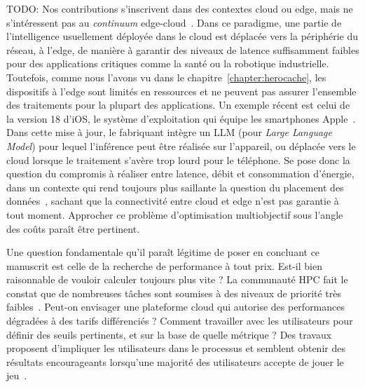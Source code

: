 TODO: Nos contributions s'inscrivent dans des contextes cloud ou edge, mais ne s'intéressent pas au \textit{continuum} edge-cloud~\cite{jansenSPECRGReferenceArchitecture2023}. Dans ce paradigme, une partie de l'intelligence usuellement déployée dans le cloud est déplacée vers la périphérie du réseau, à l'edge, de manière à garantir des niveaux de latence suffisamment faibles pour des applications critiques comme la santé ou la robotique industrielle. Toutefois, comme nous l'avons vu dans le chapitre~\ref{chapter:herocache}, les dispositifs à l'edge sont limités en ressources et ne peuvent pas assurer l'ensemble des traitements pour la plupart des applications. Un exemple récent est celui de la version 18 d'iOS, le système d'exploitation qui équipe les smartphones Apple~\cite{WhatAppleIntelligence}. Dans cette mise à jour, le fabriquant intègre un \gls{LLM} (pour \textit{Large Language Model}) pour lequel l'inférence peut être réalisée sur l'appareil, ou déplacée vers le cloud lorsque le traitement s'avère trop lourd pour le téléphone. Se pose donc la question du compromis à réaliser entre latence, débit et consommation d'énergie, dans un contexte qui rend toujours plus saillante la question du placement des données~\cite{chikhaouiMultiobjectiveOptimizationData2021a}, sachant que la connectivité entre cloud et edge n'est pas garantie à tout moment. Approcher ce problème d'optimisation multiobjectif sous l'angle des coûts paraît être pertinent.

Une question fondamentale qu'il paraît légitime de poser en concluant ce manuscrit est celle de la recherche de performance à tout prix. Est-il bien raisonnable de vouloir calculer toujours plus vite ? La communauté \gls{HPC} fait le constat que de nombreuses tâches sont soumises à des niveaux de priorité très faibles~\cite{tirmaziBorgNextGeneration2020}. Peut-on envisager une plateforme cloud qui autorise des performances dégradées à des tarifs différenciés ? Comment travailler avec les utilisateurs pour définir des seuils pertinents, et sur la base de quelle métrique ? Des travaux proposent d'impliquer les utilisateurs dans le processus et semblent obtenir des résultats encourageants lorsqu'une majorité des utilisateurs accepte de jouer le jeu~\cite{mokhtariDigitalSustainabilityInvolving}.
